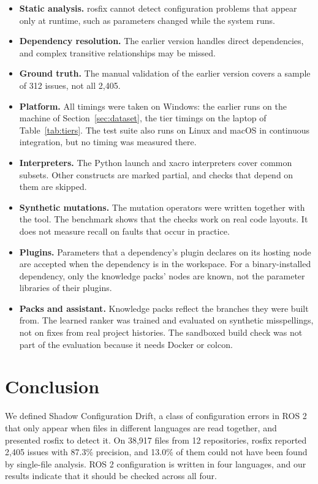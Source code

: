 \documentclass[conference]{IEEEtran}
\begin{document}
\begin{itemize}
\item \textbf{Static analysis.} rosfix cannot detect configuration problems that appear only at runtime,
  such as parameters changed while the system runs.
\item \textbf{Dependency resolution.} The earlier version handles direct dependencies, and complex
  transitive relationships may be missed.
\item \textbf{Ground truth.} The manual validation of the earlier version covers a sample of 312 issues,
  not all 2,405.
\item \textbf{Platform.} All timings were taken on Windows: the earlier runs on the machine of
  Section~\ref{sec:dataset}, the tier timings on the laptop of Table~\ref{tab:tiers}. The test
  suite also runs on Linux and macOS in continuous integration, but no timing was measured there.
\item \textbf{Interpreters.} The Python launch and xacro interpreters cover common subsets. Other
  constructs are marked partial, and checks that depend on them are skipped.
\item \textbf{Synthetic mutations.} The mutation operators were written together with the tool. The
  benchmark shows that the checks work on real code layouts. It does not measure recall on faults
  that occur in practice.
\item \textbf{Plugins.} Parameters that a dependency's plugin declares on its hosting node are accepted
  when the dependency is in the workspace. For a binary-installed dependency, only the knowledge
  packs' nodes are known, not the parameter libraries of their plugins.
\item \textbf{Packs and assistant.} Knowledge packs reflect the branches they were built from. The
  learned ranker was trained and evaluated on synthetic misspellings, not on fixes from real
  project histories. The sandboxed build check was not part of the evaluation because it needs
  Docker or colcon.
\end{itemize}

\section{Conclusion}

We defined Shadow Configuration Drift, a class of configuration errors in ROS 2 that only appear
when files in different languages are read together, and presented rosfix to detect it. On
38,917 files from 12 repositories, rosfix reported 2,405 issues with 87.3\% precision, and
13.0\% of them could not have been found by single-file analysis. ROS 2 configuration is written
in four languages, and our results indicate that it should be checked across all four.
\end{document}
